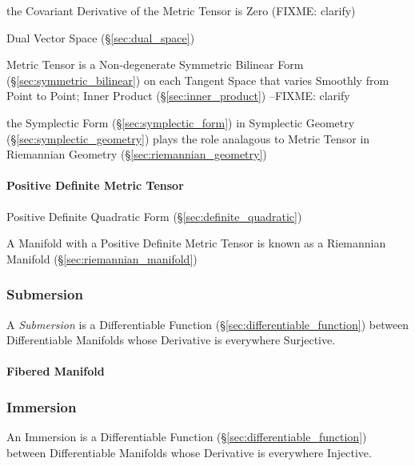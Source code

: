 the Covariant Derivative of the Metric Tensor is Zero (FIXME: clarify)

Dual Vector Space (\S\ref{sec:dual_space})

Metric Tensor is a Non-degenerate Symmetric Bilinear Form
(\S\ref{sec:symmetric_bilinear}) on each Tangent Space that varies Smoothly from
Point to Point; Inner Product (\S\ref{sec:inner_product}) --FIXME: clarify

the Symplectic Form (\S\ref{sec:symplectic_form}) in Symplectic Geometry
(\S\ref{sec:symplectic_geometry}) plays the role analagous to Metric Tensor in
Riemannian Geometry (\S\ref{sec:riemannian_geometry})



\paragraph{Positive Definite Metric Tensor}
\label{sec:positive_definite_metric_tensor}\hfill

Positive Definite Quadratic Form (\S\ref{sec:definite_quadratic})

A Manifold with a Positive Definite Metric Tensor is known as a
Riemannian Manifold (\S\ref{sec:riemannian_manifold})



\subsubsection{Submersion}\label{sec:submersion}

A \emph{Submersion} is a Differentiable Function
(\S\ref{sec:differentiable_function}) between Differentiable Manifolds
whose Derivative is everywhere Surjective.



\paragraph{Fibered Manifold}\label{sec:fibered_manifold}\hfill



\subsubsection{Immersion}\label{sec:immersion}

An Immersion is a Differentiable Function
(\S\ref{sec:differentiable_function}) between Differentiable Manifolds
whose Derivative is everywhere Injective.



